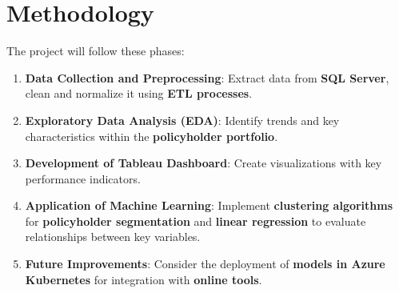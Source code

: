 \section{Methodology}

The project will follow these phases:

\begin{enumerate}
    \item \textbf{Data Collection and Preprocessing}: 
          Extract data from \textbf{SQL Server}, clean 
          and normalize it using \textbf{ETL processes}.
    \item \textbf{Exploratory Data Analysis (EDA)}: 
          Identify trends and key characteristics within 
          the \textbf{policyholder portfolio}.
    \item \textbf{Development of Tableau Dashboard}: 
          Create visualizations with key performance 
          indicators.
    \item \textbf{Application of Machine Learning}: 
          Implement \textbf{clustering algorithms} for 
          \textbf{policyholder segmentation} and 
          \textbf{linear regression} to evaluate 
          relationships between key variables.
    \item \textbf{Future Improvements}: Consider the 
          deployment of \textbf{models in Azure Kubernetes} 
          for integration with \textbf{online tools}.
\end{enumerate}